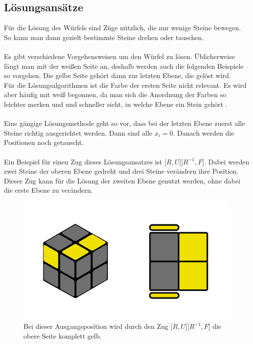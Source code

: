 \documentclass[12pt,a4paper, usenames, dvipsnames]{article}
\begin{document}
\subsection*{Lösungsansätze}
Für die Lösung des Würfels sind Züge nützlich, die nur wenige Steine bewegen. So kann man dann gezielt bestimmte Steine drehen oder tauschen. \\
\\
Es gibt verschiedene Vorgehensweisen um den Würfel zu lösen. Üblicherweise fängt man mit der weißen Seite an, deshalb werden auch die folgenden Beispiele so vorgehen. Die gelbe Seite gehört dann zur letzten Ebene, die gelöst wird. \\
Für die Lösungsalgorithmen ist die Farbe der ersten Seite nicht relevant. Es wird aber häufig mit weiß begonnen, da man sich die Anordnung der Farben so leichter merken und und schneller sieht, in welche Ebene ein Stein gehört \cite{RF}. \\
\\
Eine gängige Lösungsmethode geht so vor, dass bei der letzten Ebene zuerst alle Steine richtig ausgerichtet werden. Dann sind alle $x_i=0$. Danach werden die Positionen noch getauscht. \\
\\
Ein Beispiel für einen Zug dieses Lösungsansatzes ist $\lbrack R, U \rbrack \lbrack R^{-1}, F \rbrack$. Dabei werden zwei Steine der oberen Ebene gedreht und drei Steine verändern ihre Position. Dieser Zug kann für die Lösung der zweiten Ebene genutzt werden, ohne dabei die erste Ebene zu verändern. 

\begin{figure}[H]
\centering
\includegraphics[scale=0.15]{RURF.png}
\caption[Würfelposition für Zug $\lbrack R, U \rbrack \lbrack R^{-1}, F \rbrack$]{Bei dieser Ausgangsposition wird durch den Zug $\lbrack R, U \rbrack \lbrack R^{-1}, F \rbrack$ die obere Seite komplett gelb.}

\end{figure}
\end{document}
